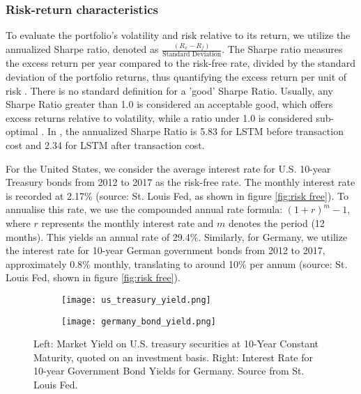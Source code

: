 \documentclass{article}
\begin{document}
\subsubsection{Risk-return characteristics} 
To evaluate the portfolio's volatility and risk relative to its return, we utilize the annualized Sharpe ratio, denoted as $\frac{(R_x-R_f)}{\text{Standard Deviation}}$. The Sharpe ratio measures the excess return per year compared to the risk-free rate, divided by the standard deviation of the portfolio returns, thus quantifying the excess return per unit of risk \citep{sharpe1998sharpe}. There is no standard definition for a 'good' Sharpe Ratio. Usually, any Sharpe Ratio greater than 1.0 is considered an acceptable good, which offers excess returns relative to volatility, while a ratio under 1.0 is considered sub-optimal \citep{investopedia_sharpe_ratio}. In  \cite{fischer2018deep}, the annualized Sharpe Ratio is 5.83 for LSTM before transaction cost and 2.34 for LSTM after transaction cost. 

For the United States, we consider the average interest rate for U.S. 10-year Treasury bonds from 2012 to 2017 as the risk-free rate. The monthly interest rate is recorded at 2.17\% (source: St. Louis Fed, as shown in figure \ref{fig:risk free}). To annualise this rate, we use the compounded annual rate formula: $(1 + r)^m - 1$, where $r$ represents the monthly interest rate and $m$ denotes the period (12 months). This yields an annual rate of 29.4\%. Similarly, for Germany, we utilize the interest rate for 10-year German government bonds from 2012 to 2017, approximately 0.8\% monthly, translating to around 10\% per annum (source: St. Louis Fed, shown in figure \ref{fig:risk free}).

\begin{figure}[!ht]
    \centering
    \begin{subfigure}[b]{0.7\textwidth} 
      \centering
      \texttt{[image: us\_treasury\_yield.png]}
    \end{subfigure}
    \hfill
    \begin{subfigure}[b]{0.7\textwidth} 
      \centering
      \texttt{[image: germany\_bond\_yield.png]}
    \end{subfigure}
    \caption{Left: Market Yield on U.S. treasury securities at 10-Year Constant Maturity, quoted on an investment basis. Right: Interest Rate for 10-year Government Bond Yields for Germany. Source from St. Louis Fed.}
    \label{fig:risk_free}
\end{figure}
\end{document}
